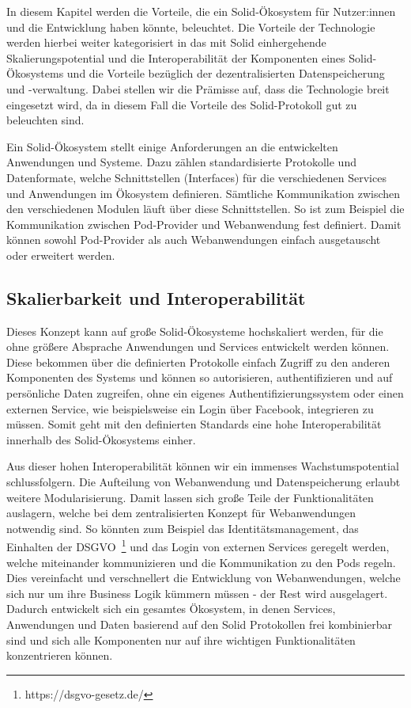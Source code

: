 \documentclass[acmtog]{acmart}
\begin{document}
In diesem Kapitel werden die Vorteile, die ein Solid-Ökosystem für Nutzer:innen und die Entwicklung haben könnte, beleuchtet. Die Vorteile der Technologie werden hierbei weiter kategorisiert in das mit Solid einhergehende Skalierungspotential und die Interoperabilität der Komponenten eines Solid-Ökosystems und die Vorteile bezüglich der dezentralisierten Datenspeicherung und -verwaltung. Dabei stellen wir die Prämisse auf, dass die Technologie breit eingesetzt wird, da in diesem Fall die Vorteile des Solid-Protokoll gut zu beleuchten sind.

Ein Solid-Ökosystem stellt einige Anforderungen an die entwickelten Anwendungen und Systeme. Dazu zählen standardisierte Protokolle und Datenformate, welche Schnittstellen (Interfaces) für die verschiedenen Services und Anwendungen im Ökosystem definieren. Sämtliche Kommunikation zwischen den verschiedenen Modulen läuft über diese Schnittstellen. So ist zum Beispiel die Kommunikation zwischen Pod-Provider und Webanwendung fest definiert. Damit können sowohl Pod-Provider als auch Webanwendungen einfach ausgetauscht oder erweitert werden. 

\label{subsection:vorteile:skalierbarkeitUndInteroperabilität}
\subsection{Skalierbarkeit und Interoperabilität}

Dieses Konzept kann auf große Solid-Ökosysteme hochskaliert werden, für die ohne größere Absprache Anwendungen und Services entwickelt werden können. Diese bekommen über die definierten Protokolle einfach Zugriff zu den anderen Komponenten des Systems und können so autorisieren, authentifizieren und auf persönliche Daten zugreifen, ohne ein eigenes Authentifizierungssystem oder einen externen Service, wie beispielsweise ein Login über Facebook, integrieren zu müssen. Somit geht mit den definierten Standards eine hohe Interoperabilität innerhalb des Solid-Ökosystems einher.
\cite{8633673}

Aus dieser hohen Interoperabilität können wir ein immenses Wachstumspotential schlussfolgern. Die Aufteilung von Webanwendung und Datenspeicherung erlaubt weitere Modularisierung. Damit lassen sich große Teile der Funktionalitäten auslagern, welche bei dem zentralisierten Konzept für Webanwendungen notwendig sind. So könnten zum Beispiel das Identitätsmanagement, das Einhalten der DSGVO~\footnote{https://dsgvo-gesetz.de/} und das Login von externen Services geregelt werden, welche miteinander kommunizieren und die Kommunikation zu den Pods regeln. Dies vereinfacht und verschnellert die Entwicklung von Webanwendungen, welche sich nur um ihre Business Logik kümmern müssen - der Rest wird ausgelagert. Dadurch entwickelt sich ein gesamtes Ökosystem, in denen Services, Anwendungen und Daten basierend auf den Solid Protokollen frei kombinierbar sind und sich alle Komponenten nur auf ihre wichtigen Funktionalitäten konzentrieren können. 
\end{document}
